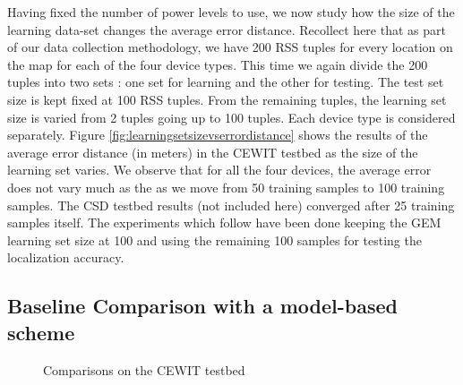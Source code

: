 \documentclass{Localization-PaperWriteupDraft}
\begin{document}
Having fixed the number of power levels to use, we now study how the size of the learning data-set changes the average error distance. Recollect here that as part of our data collection methodology, we have 200 RSS tuples for every location on the map for each of the four device types. This time we again divide the 200 tuples into two sets : one set for learning and the other for testing. The test set size is kept fixed at 100 RSS tuples. From the remaining tuples, the learning set size is varied from 2 tuples going up to 100 tuples. Each device type is considered separately. Figure \ref{fig:learningsetsizevserrordistance} shows the results of the average error distance (in meters) in the CEWIT testbed as the size of the learning set varies. We observe that for all the four devices, the average error does not vary much as the as we move from 50 training samples to 100 training samples. The CSD testbed results (not included here) converged after 25 training samples itself. The experiments which follow have been done keeping the GEM learning set size at 100 and using the remaining 100 samples for testing the localization accuracy.  

\subsection{Baseline Comparison with a model-based scheme}
\label{subsec:baselinecomparisonwithamodelbasedscheme}

\begin{figure}
	\centering
	\caption{Comparisons on the CEWIT testbed}
	\label{fig:HR_on_cewittestbed}
\end{figure}
\end{document}
